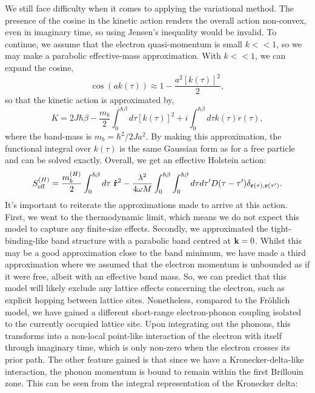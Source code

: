 We still face difficulty when it comes to applying the variational method. The presence of the cosine in the kinetic action renders the overall action non-convex, even in imaginary time, so using Jensen's inequality would be invalid. To continue, we assume that the electron quasi-momentum is small $k << 1$, so we may make a parabolic effective-mass approximation. With $k << 1$, we can expand the cosine,
\begin{equation}
    \cos(a k(\tau)) \approx 1 - \frac{a^2 [k(\tau)]^2}{2} ,
\end{equation}
so that the kinetic action is approximated by,
\begin{equation}
    K = 2 J \hbar \beta - \frac{m_b}{2} \int_0^{\hbar\beta} d\tau \left[k(\tau)\right]^2 + i \int_0^{\hbar\beta} d\tau k(\tau) \Dot{r}(\tau) ,
\end{equation}
where the band-mass is $m_b = \hbar^2 / 2 J a^2$. By making this approximation, the functional integral over $k(\tau)$ is the same Gaussian form as for a free particle and can be solved exactly. Overall, we get an effective Holstein action:
\begin{equation}
    S_{\text{eff}}^{(H)} = \frac{m^{(H)}_b}{2} \int_0^{\hbar\beta} d\tau\ \vb{\Dot{r}}^2 - \frac{\lambda^2}{4 \omega M} \int_0^{\hbar\beta} \int_0^{\hbar\beta} d\tau d\tau' D(\tau - \tau') \delta_{\vb{r}(\tau), \vb{r}(\tau')} .
\end{equation}
It's important to reiterate the approximations made to arrive at this action. First, we went to the thermodynamic limit, which means we do not expect this model to capture any finite-size effects. Secondly, we approximated the tight-binding-like band structure with a parabolic band centred at $\vb{k} = 0$. Whilst this may be a good approximation close to the band minimum, we have made a third approximation where we assumed that the electron momentum is unbounded as if it were free, albeit with an effective band mass. So, we can predict that this model will likely exclude any lattice effects concerning the electron, such as explicit hopping between lattice sites. Nonetheless, compared to the Fr\"ohlich model, we have gained a different short-range electron-phonon coupling isolated to the currently occupied lattice site. Upon integrating out the phonons, this transforms into a non-local point-like interaction of the electron with itself through imaginary time, which is only non-zero when the electron crosses its prior path. The other feature gained is that since we have a Kronecker-delta-like interaction, the phonon momentum is bound to remain within the first Brillouin zone. This can be seen from the integral representation of the Kronecker delta:
